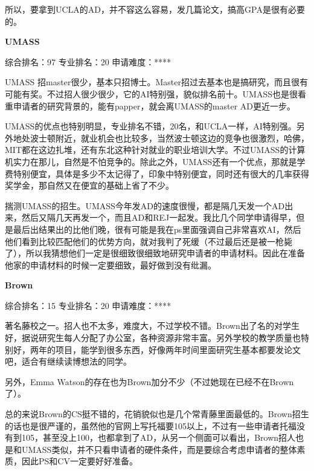 所以，要拿到UCLA的AD，并不容这么容易，发几篇论文，搞高GPA是很有必要的。\par

\textbf{UMASS}\par
综合排名：97 专业排名：20 申请难度：**** \par

UMASS 招master很少，基本只招博士。Master招过去基本也是搞研究，而且很有可能有奖。不过招人很少很少，它的AI特别强，貌似排名前十。UMASS也是很看重申请者的研究背景的，能有papper，就会离UMASS的master AD更近一步。\par

UMASS的优点也特别明显，专业排名不错，20名，和UCLA一样，AI特别强。另外地处波士顿附近，就业机会也比较多，当然波士顿这边的竞争也很激烈，哈佛，MIT都在这边扎堆，还有东北这种针对就业的职业培训大学。不过UMASS的计算机实力在那儿，自然是不怕竞争的。除此之外，UMASS还有一个优点，那就是学费特别便宜，具体是多少不太记得了，印象中特别便宜，同时还有很大的几率获得奖学金，那自然又在便宜的基础上省了不少。\par

揣测UMASS的招生。UMASS今年发AD的速度很慢，都是隔几天发一个AD出来，然后又隔几天再发一个，而且AD和REJ一起发。我比几个同学申请得早，但是最后出结果出的比他们晚，很有可能是我在ps里面强调自己非常喜欢AI，然后他们看到比较匹配他们的优势方向，就对我判了死缓（不过最后还是被一枪毙了），所以我猜想他们一定是很细致很细致地研究申请者的申请材料。因此在准备他家的申请材料的时候一定要细致，最好做到没有纰漏。\par

\textbf{Brown}\par
综合排名：15 专业排名：20 申请难度：**** \par

著名藤校之一。招人也不太多，难度大，不过学校不错。Brown出了名的对学生好，据说研究生每人分配了办公室，各种资源非常丰富。另外学校的教学质量也特别好，两年的项目，能学到很多东西，好像两年时间里面研究生基本都要发论文吧，适合有继续读博想法的同学。\par

另外，Emma Watson的存在也为Brown加分不少（不过她现在已经不在Brown了）。\par

总的来说Brown的CS挺不错的，花销貌似也是几个常青藤里面最低的。Brown招生的话也是很严谨的，虽然他的官网上写托福要105以上，不过有一些申请者托福没有到105，甚至没上100，也都拿到了AD，从另一个侧面可以看出，Brown招人也是和UMASS类似，并不只看申请者的硬件条件，而是要综合考虑申请者的整体素质，因此PS和CV一定要好好准备。\par


